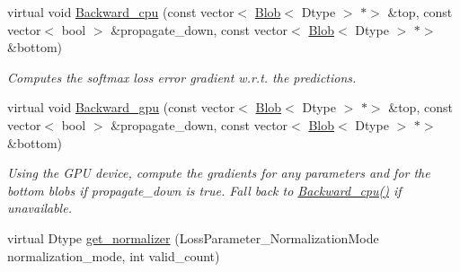\begin{DoxyCompactItemize}
virtual void \mbox{\hyperlink{classcaffe_1_1_softmax_with_loss_layer_a3d2fa01c50cd9bdef567d0e6b5cfcdc3}{Backward\+\_\+cpu}} (const vector$<$ \mbox{\hyperlink{classcaffe_1_1_blob}{Blob}}$<$ Dtype $>$ $\ast$$>$ \&top, const vector$<$ bool $>$ \&propagate\+\_\+down, const vector$<$ \mbox{\hyperlink{classcaffe_1_1_blob}{Blob}}$<$ Dtype $>$ $\ast$$>$ \&bottom)
\begin{DoxyCompactList}\small\item\em Computes the softmax loss error gradient w.\+r.\+t. the predictions. \end{DoxyCompactList}\item 
\mbox{\label{classcaffe_1_1_softmax_with_loss_layer_ac6ae6482673cab4933ceb67972f80ee7}} 
virtual void \mbox{\hyperlink{classcaffe_1_1_softmax_with_loss_layer_ac6ae6482673cab4933ceb67972f80ee7}{Backward\+\_\+gpu}} (const vector$<$ \mbox{\hyperlink{classcaffe_1_1_blob}{Blob}}$<$ Dtype $>$ $\ast$$>$ \&top, const vector$<$ bool $>$ \&propagate\+\_\+down, const vector$<$ \mbox{\hyperlink{classcaffe_1_1_blob}{Blob}}$<$ Dtype $>$ $\ast$$>$ \&bottom)
\begin{DoxyCompactList}\small\item\em Using the G\+PU device, compute the gradients for any parameters and for the bottom blobs if propagate\+\_\+down is true. Fall back to \mbox{\hyperlink{classcaffe_1_1_softmax_with_loss_layer_a39d8b7d59f2c951ac2573827f181284f}{Backward\+\_\+cpu()}} if unavailable. \end{DoxyCompactList}\item 
virtual Dtype \mbox{\hyperlink{classcaffe_1_1_softmax_with_loss_layer_aeb270fe4b77dfcf49eabd22437242e9f}{get\+\_\+normalizer}} (Loss\+Parameter\+\_\+\+Normalization\+Mode normalization\+\_\+mode, int valid\+\_\+count)
\end{DoxyCompactItemize}
